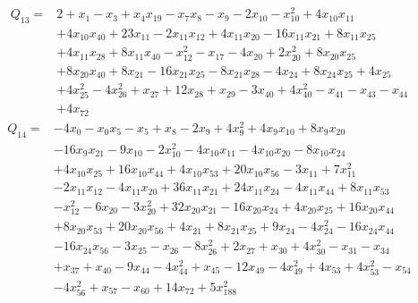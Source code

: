 \begin{equation*}\begin{aligned}
Q_{13}={}& 2+x_{1}-x_{3}+x_{4}x_{19}-x_{7}x_{8}-x_{9}-2x_{10}-x_{10}^{2}+4x_{10}x_{11}\\
& +4x_{10}x_{40}+23x_{11}-2x_{11}x_{12}+4x_{11}x_{20}-16x_{11}x_{21}+8x_{11}x_{25}\\
& +4x_{11}x_{28}+8x_{11}x_{40}-x_{12}^{2}-x_{17}-4x_{20}+2x_{20}^{2}+8x_{20}x_{25}\\
& +8x_{20}x_{40}+8x_{21}-16x_{21}x_{25}-8x_{21}x_{28}-4x_{24}+8x_{24}x_{25}+4x_{25}\\
& +4x_{25}^{2}-4x_{26}^{2}+x_{27}+12x_{28}+x_{29}-3x_{40}+4x_{40}^{2}-x_{41}-x_{43}-x_{44}\\
& +4x_{72}
\end{aligned}\end{equation*}
\begin{equation*}\begin{aligned}
Q_{14}={}& -4x_{0}-x_{0}x_{5}-x_{5}+x_{8}-2x_{9}+4x_{9}^{2}+4x_{9}x_{10}+8x_{9}x_{20}\\
& -16x_{9}x_{21}-9x_{10}-2x_{10}^{2}-4x_{10}x_{11}-4x_{10}x_{20}-8x_{10}x_{24}\\
& +4x_{10}x_{25}+16x_{10}x_{44}+4x_{10}x_{53}+20x_{10}x_{56}-3x_{11}+7x_{11}^{2}\\
& -2x_{11}x_{12}-4x_{11}x_{20}+36x_{11}x_{21}+24x_{11}x_{24}-4x_{11}x_{44}+8x_{11}x_{53}\\
& -x_{12}^{2}-6x_{20}-3x_{20}^{2}+32x_{20}x_{21}-16x_{20}x_{24}+4x_{20}x_{25}+16x_{20}x_{44}\\
& +8x_{20}x_{53}+20x_{20}x_{56}+4x_{21}+8x_{21}x_{25}+9x_{24}-4x_{24}^{2}-16x_{24}x_{44}\\
& -16x_{24}x_{56}-3x_{25}-x_{26}-8x_{26}^{2}+2x_{27}+x_{30}+4x_{30}^{2}-x_{31}-x_{34}\\
& +x_{37}+x_{40}-9x_{44}-4x_{44}^{2}+x_{45}-12x_{49}-4x_{49}^{2}+4x_{53}+4x_{53}^{2}-x_{54}\\
& -4x_{56}^{2}+x_{57}-x_{60}+14x_{72}+5x_{188}^{2}
\end{aligned}\end{equation*}
